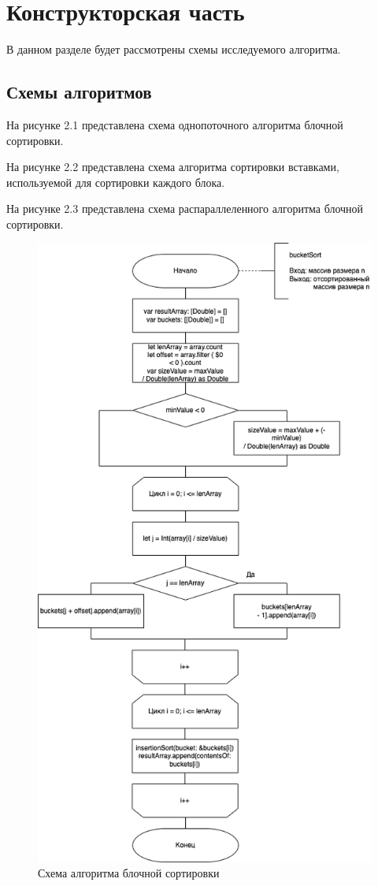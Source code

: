 \chapter{Конструкторская часть}
В данном разделе будет рассмотрены схемы исследуемого алгоритма.

\section{Схемы алгоритмов}

На рисунке 2.1 представлена схема однопоточного алгоритма блочной сортировки.

На рисунке 2.2 представлена схема алгоритма сортировки вставками, используемой для сортировки каждого блока.

На рисунке 2.3 представлена схема распараллеленного алгоритма блочной сортировки.

\begin{figure}[h!]
	\centering
	\includegraphics[width=0.8\linewidth]{img/Bucket.png}
	\caption{Схема алгоритма блочной сортировки}
	\label{fig:mpr}
\end{figure}

